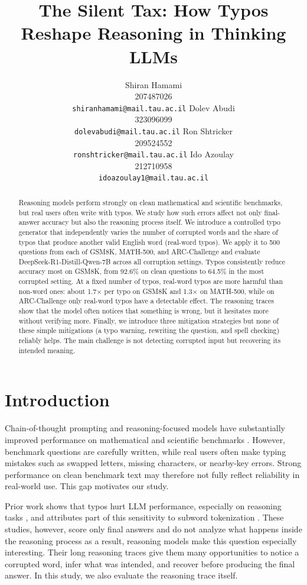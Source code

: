 \documentclass[11pt]{article}
\title{The Silent Tax: How Typos Reshape Reasoning in Thinking LLMs}
\author{Shiran Hamami \\ 207487026 \\ \texttt{shiranhamami@mail.tau.ac.il} \And
Dolev Abudi \\ 323096099 \\ \texttt{dolevabudi@mail.tau.ac.il} \AND
Ron Shtricker \\ 209524552 \\ \texttt{ronshtricker@mail.tau.ac.il} \And
Ido Azoulay \\ 212710958 \\ \texttt{idoazoulay1@mail.tau.ac.il}}
\begin{document}
\maketitle
\begin{abstract}
Reasoning models perform strongly on clean mathematical and scientific benchmarks, but real users often write with typos. We study how such errors affect not only final-answer accuracy but also the reasoning process itself. We introduce a controlled typo generator that independently varies the number of corrupted words and the share of typos that produce another valid English word (real-word typos). We apply it to 500 questions from each of GSM8K, MATH-500, and ARC-Challenge and evaluate DeepSeek-R1-Distill-Qwen-7B across all corruption settings. Typos consistently reduce accuracy most on GSM8K, from 92.6\% on clean questions to 64.5\% in the most corrupted setting. At a fixed number of typos, real-word typos are more harmful than non-word ones: about 1.7$\times$ per typo on GSM8K and 1.3$\times$ on MATH-500, while on ARC-Challenge only real-word typos have a detectable effect. The reasoning traces show that the model often notices that something is wrong, but it hesitates more without verifying more. Finally, we introduce three mitigation strategies but none of these simple mitigations (a typo warning, rewriting the question, and spell checking) reliably helps. The main challenge is not detecting corrupted input but recovering its intended meaning.
\end{abstract}

\section{Introduction}
Chain-of-thought prompting and reasoning-focused models have substantially improved performance on mathematical and scientific benchmarks \citep{wei2022,guo2025}. However, benchmark questions are carefully written, while real users often make typing mistakes such as swapped letters, missing characters, or nearby-key errors. Strong performance on clean benchmark text may therefore not fully reflect reliability in real-world use. This gap motivates our study.

Prior work shows that typos hurt LLM performance, especially on reasoning tasks \citep{gan2024,zhao2026}, and attributes part of this sensitivity to subword tokenization \citep{chai2024}. These studies, however, score only final answers and do not analyze what happens inside the reasoning process as a result, reasoning models make this question especially interesting. Their long reasoning traces give them many opportunities to notice a corrupted word, infer what was intended, and recover before producing the final answer. In this study, we also evaluate the reasoning trace itself.
\end{document}
